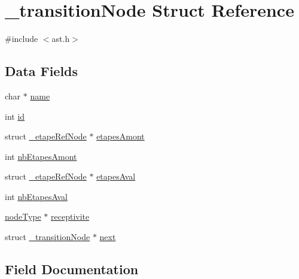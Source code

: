 \hypertarget{struct__transition_node}{}\section{\+\_\+transition\+Node Struct Reference}
\label{struct__transition_node}


{\ttfamily \#include $<$ast.\+h$>$}

\subsection*{Data Fields}
\begin{DoxyCompactItemize}
\item 
char $\ast$ \hyperlink{struct__transition_node_a5ac083a645d964373f022d03df4849c8}{name}
\item 
int \hyperlink{struct__transition_node_a7441ef0865bcb3db9b8064dd7375c1ea}{id}
\item 
struct \hyperlink{struct__etape_ref_node}{\+\_\+etape\+Ref\+Node} $\ast$ \hyperlink{struct__transition_node_a5e9cc6da015f54b9befa60a83e3f977b}{etapes\+Amont}
\item 
int \hyperlink{struct__transition_node_aff380fa425320db7b31cdee676e9482d}{nb\+Etapes\+Amont}
\item 
struct \hyperlink{struct__etape_ref_node}{\+\_\+etape\+Ref\+Node} $\ast$ \hyperlink{struct__transition_node_a7cffe069eecd1d267fcfc1de35a4749b}{etapes\+Aval}
\item 
int \hyperlink{struct__transition_node_acce8a1259c8588acfc2368711f0a353a}{nb\+Etapes\+Aval}
\item 
\hyperlink{ast_8h_a5107519e23f35648044d9a2300d4a609}{node\+Type} $\ast$ \hyperlink{struct__transition_node_a7860dac0e1d3741069388343aa0d8780}{receptivite}
\item 
struct \hyperlink{struct__transition_node}{\+\_\+transition\+Node} $\ast$ \hyperlink{struct__transition_node_a0f7b7df0c2ac19f3c902dad0f560a1bd}{next}
\end{DoxyCompactItemize}


\subsection{Field Documentation}
\mbox{\label{struct__transition_node_a5e9cc6da015f54b9befa60a83e3f977b}} 
